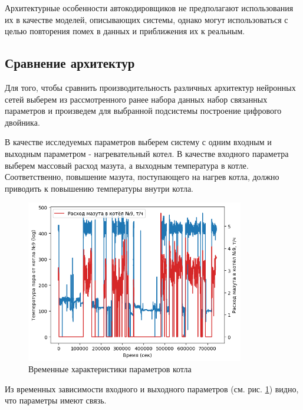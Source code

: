 Архитектурные особенности автокодировщиков не предполагают использования их в
качестве моделей, описывающих системы, однако могут использоваться с целью
повторения помех в данных и приближения их к реальным.

\subsection{Сравнение архитектур}

Для того, чтобы сравнить производительность различных архитектур нейронных сетей
выберем из рассмотренного ранее набора данных набор связанных параметров и
произведем для выбранной подсистемы построение цифрового двойника. 

В качестве исследуемых параметров выберем систему с одним входным и выходным
параметром - нагревательный котел. В качестве входного параметра выберем
массовый расход мазута, а выходным температура в котле. Соответственно,
повышение мазута, поступающего на нагрев котла, должно приводить к повышению
температуры внутри котла. 

\begin{figure}[H]
  \centering
    \includegraphics[width=0.85\textwidth]{figures/plots/kotel_temp_mazut.png}
  \caption{Временные характеристики параметров котла}\label{fig:plt:kotel}
\end{figure}

Из временных зависимости входного и выходного параметров (см. рис.
\ref{fig:plt:kotel}) видно, что параметры имеют связь. 

